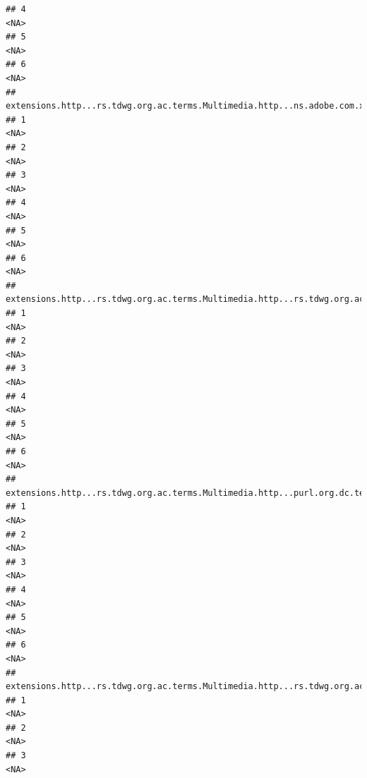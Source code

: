 \documentclass[
]{book}
\begin{document}
\begin{verbatim}
## 4                                                                                        <NA>
## 5                                                                                        <NA>
## 6                                                                                        <NA>
##   extensions.http...rs.tdwg.org.ac.terms.Multimedia.http...ns.adobe.com.xap.1.0.CreateDate.2
## 1                                                                                       <NA>
## 2                                                                                       <NA>
## 3                                                                                       <NA>
## 4                                                                                       <NA>
## 5                                                                                       <NA>
## 6                                                                                       <NA>
##   extensions.http...rs.tdwg.org.ac.terms.Multimedia.http...rs.tdwg.org.ac.terms.caption.2
## 1                                                                                    <NA>
## 2                                                                                    <NA>
## 3                                                                                    <NA>
## 4                                                                                    <NA>
## 5                                                                                    <NA>
## 6                                                                                    <NA>
##   extensions.http...rs.tdwg.org.ac.terms.Multimedia.http...purl.org.dc.terms.title.2
## 1                                                                               <NA>
## 2                                                                               <NA>
## 3                                                                               <NA>
## 4                                                                               <NA>
## 5                                                                               <NA>
## 6                                                                               <NA>
##   extensions.http...rs.tdwg.org.ac.terms.Multimedia.http...rs.tdwg.org.ac.terms.accessURI.2
## 1                                                                                      <NA>
## 2                                                                                      <NA>
## 3                                                                                      <NA>

\end{verbatim}
\end{document}
